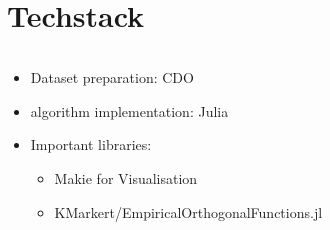 \section{Techstack}

\begin{frame}

  \begin{columns}
    \begin{column}{.5\columnwidth}
      \begin{itemize}
        \item Dataset preparation: CDO \cite{schulzweida2019cdo}
        \item algorithm implementation: Julia \cite{gao_julia_2020}
        \item Important libraries:
          \begin{itemize}
            \item Makie for Visualisation
            \item KMarkert/EmpiricalOrthogonalFunctions.jl
          \end{itemize}
        
      \end{itemize}  
    \end{column}
    \begin{column}{.5\columnwidth}
      
    \end{column}
  \end{columns}
  
\end{frame}
